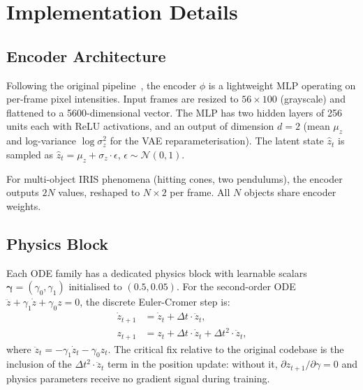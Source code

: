 \documentclass[runningheads]{llncs}
\begin{document}
\section{Implementation Details}
\label{app:impl}

\subsection{Encoder Architecture}
\label{app:encoder}

Following the original pipeline~\cite{garcia2025learning}, the encoder
$\phi$ is a lightweight MLP operating on per-frame pixel intensities.
Input frames are resized to $56 \times 100$ (grayscale) and flattened to a
5600-dimensional vector. The MLP has two hidden layers of 256 units each
with ReLU activations, and an output of dimension $d = 2$ (mean $\mu_z$
and log-variance $\log\sigma^2_z$ for the VAE reparameterisation). The
latent state $\hat{z}_t$ is sampled as
$\hat{z}_t = \mu_z + \sigma_z \cdot \epsilon$, $\epsilon \sim \mathcal{N}(0,1)$.

For multi-object IRIS phenomena (hitting cones, two pendulums), the encoder
outputs $2N$ values, reshaped to $N \times 2$ per frame. All $N$ objects
share encoder weights.

\subsection{Physics Block}
\label{app:physics_block}

Each ODE family has a dedicated physics block with learnable scalars
$\boldsymbol{\gamma} = (\gamma_0, \gamma_1)$ initialised to $(0.5, 0.05)$.
For the second-order ODE $\ddot{z} + \gamma_1\dot{z} + \gamma_0 z = 0$,
the discrete Euler-Cromer step is:
%
\begin{align}
  \dot{z}_{t+1} &= \dot{z}_t + \Delta t \cdot \ddot{z}_t, \\
  z_{t+1}       &= z_t     + \Delta t \cdot \dot{z}_t
                           + \Delta t^2 \cdot \ddot{z}_t,
\end{align}
%
where $\ddot{z}_t = -\gamma_1\dot{z}_t - \gamma_0 z_t$.  The critical fix
relative to the original codebase is the inclusion of the
$\Delta t^2 \cdot \ddot{z}_t$ term in the position update: without it,
$\partial z_{t+1}/\partial \gamma = 0$ and physics parameters receive no
gradient signal during training.
\end{document}

